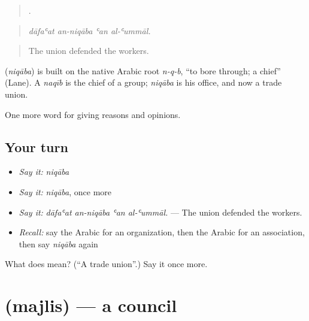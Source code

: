 \begin{quote}
   .
\end{quote}

\begin{quote}
\emph{dāfaʿat an-niqāba ʿan al-ʿummāl.}
\end{quote}

\begin{quote}
The union defended the workers.
\end{quote}

\begin{cousinweb}
\textbf{} (\emph{niqāba}) is built on the native Arabic root \emph{n-q-b}, \textquotedblleft{}to bore through; a chief\textquotedblright{} (Lane). A \emph{naqīb} is the chief of a group; \emph{niqāba} is his office, and now a trade union.
\end{cousinweb}

\begin{grammarlens}[title={What you've built}]
One more word for giving reasons and opinions.
\end{grammarlens}

\subsection*{Your turn}
\begin{itemize}
\raggedright
  \item \emph{Say it:} \emph{niqāba}
  \item \emph{Say it:} \emph{niqāba}, once more
  \item \emph{Say it:} \emph{dāfaʿat an-niqāba ʿan al-ʿummāl.} — The union defended the workers.
  \item \emph{Recall:} say the Arabic for an organization, then the Arabic for an association, then say \emph{niqāba} again
\end{itemize}

\begin{tcolorbox}[breakable,colback=teal!4,colframe=teal!35!black,title={Before you move on}]
What does  mean? (\textquotedblleft{}A trade union\textquotedblright{}.) Say it once more.
\end{tcolorbox}
\section[\texorpdfstring{\ar{مجلس} (majlis)}{مجلس (majlis)}]{ (majlis) — a council}

\label{lesson:AR-C385-majlis}




